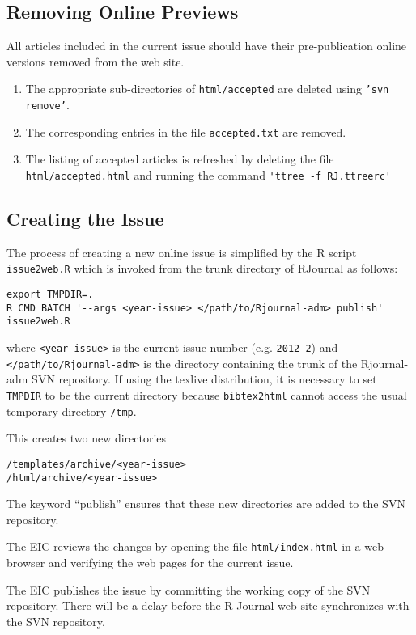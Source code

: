 \documentclass[11pt]{article}
\begin{document}
\subsection{Removing Online Previews}

All articles included in the current issue should have their 
pre-publication online versions removed from the web site. 
\begin{enumerate}
\item The appropriate sub-directories of \texttt{html/accepted} are
  deleted using \texttt{'svn remove'}.
\item The corresponding entries in the file \texttt{accepted.txt} are 
  removed.
\item The listing of accepted articles is refreshed by deleting the
  file \texttt{html/accepted.html} and running the command
  \verb+'ttree -f RJ.ttreerc'+
\end{enumerate}

\subsection{Creating the Issue}

The process of creating a new online issue is simplified by the
R script \texttt{issue2web.R} which is invoked from the trunk
directory of RJournal as follows:
{\small
\begin{verbatim}
export TMPDIR=. 
R CMD BATCH '--args <year-issue> </path/to/Rjournal-adm> publish' issue2web.R
\end{verbatim}
} where \verb+<year-issue>+ is the current issue number
(e.g. \texttt{2012-2}) and \verb+</path/to/Rjournal-adm>+ is the
directory containing the trunk of the Rjournal-adm SVN repository.  If
using the texlive distribution, it is necessary to set \texttt{TMPDIR}
to be the current directory because \texttt{bibtex2html} cannot access
the usual temporary directory \texttt{/tmp}.

This creates two new directories
\begin{verbatim}
/templates/archive/<year-issue>
/html/archive/<year-issue>
\end{verbatim}
The keyword ``publish'' ensures that these new directories are
added to the SVN repository.


The EIC reviews the changes by opening the file
\texttt{html/index.html} in a web browser and verifying the web
pages for the current issue.

The EIC publishes the issue by committing the working copy of the SVN
repository. There will be a delay before the R Journal web site
synchronizes with the SVN repository.
\end{document}
